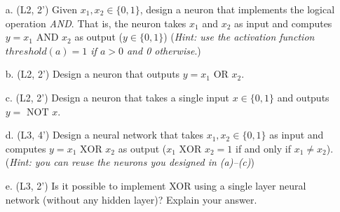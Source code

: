 \begin{enumerate}
	\item[a.] (L2, 2') Given $x_1,x_2\in \{0,1\}$, design a neuron that implements the logical operation {\it AND}.  That is, the neuron takes $x_1$ and $x_2$ as input and computes $y=x_1 \text{ AND } x_2$ as output ($y\in \{0,1\}$) ({\it Hint: use the activation function $threshold(a)=1$ if $a>0$ and 0 otherwise}.)

	
	\item[b.] (L2, 2') Design a neuron that outputs $y=x_1 \text{ OR } x_2$.

	\item[c.] (L2, 2') Design a neuron that takes a single input $x\in\{0,1\}$ and outputs $y=\text{ NOT } x$.

	
	\item[d.] (L3, 4') Design a neural network that takes $x_1, x_2\in \{0,1\}$ as input and computes $y=x_1 \text{ XOR } x_2$ as output ($x_1\text{ XOR }x_2=1$ if and only if $x_1\neq x_2$). ({\it Hint: you can reuse the neurons you designed in (a)--(c)})
	
	
	\item[e.] (L3, 2') Is it possible to implement XOR using a single layer neural network (without any hidden layer)? Explain your answer.

\end{enumerate}
